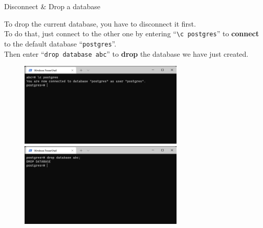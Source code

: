 \begin{frame}[fragile]{Disconnect \& Drop a database}
	
	To drop the current database, you have to disconnect it first.\\
	To do that, just connect to the other one by entering ``\texttt{\textbackslash c postgres}'' to \textbf{connect} to the default database ``\texttt{postgres}''.\\
	Then enter ``\texttt{drop database abc}'' to \textbf{drop} the database we have just created.
	
	\begin{figure}
		\includegraphics[trim=0 5cm 0 0, clip, width=0.7\textwidth]{t0-psql/images/10.png}\vspace{10pt}
		\includegraphics[trim=0 5cm 0 0, clip, width=0.7\textwidth]{t0-psql/images/11.png}
	\end{figure}
	
\end{frame}

